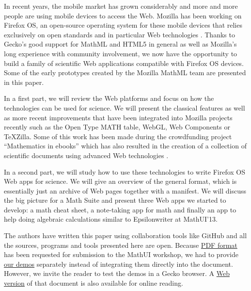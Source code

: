 In recent years, the mobile market has grown considerably and more and more
people are using mobile devices to access the Web. Mozilla has been working
on Firefox OS, an open-source operating system for these mobile devices that
relies exclusively on open standards and in particular Web technologies
\cite{MozillaFirefoxOS}. Thanks to
Gecko's good support for MathML and HTML5 in general as well as
Mozilla's long experience with community involvement, we now have the opportunity
to build a family of scientific Web applications compatible with Firefox OS devices.
Some of the early prototypes created by the Mozilla MathML team are presented
in this paper.

In a first part, we will review the Web platforms and focus on how the
technologies
can be used for science. We will present the classical features
as well as more recent improvements that have been integrated into Mozilla
projects recently such as the Open Type MATH table, WebGL, Web Components or
TeXZilla. Some of this work has been made during the crowdfunding project
``Mathematics in ebooks'' which has also resulted in the creation of a collection
of scientific documents using advanced Web technologies \cite{MathInEbooks}.

In a second
part, we will study how to use these technologies to write Firefox OS Web apps
for science. We will give an overview of the general format, which is
essentially just an archive of Web pages together with a manifest. We will
discuss the big picture for a Math Suite and present three Web apps we started
to develop: a math cheat sheet, a note-taking app for math and finally an app
to help doing algebraic calculations similar to Epsilonwriter at MathUI'13.

The authors have written this paper using collaboration tools like GitHub and
all the sources, programs and tools presented here are open. Because 
\href{http://fred-wang.github.io/MathUI2014/paper/output/MathUI2014-MozillaMathML.pdf}{PDF format}
has been requested for submission to the MathUI workshop, we had to provide
\href{http://fred-wang.github.io/MathUI2014/demos/}{our demos} separately instead of integrating them directly into the document.
However, we invite the reader to test the demos in a Gecko browser. A 
\href{http://fred-wang.github.io/MathUI2014/paper/output/}{Web version} of that document is also available for online reading.
